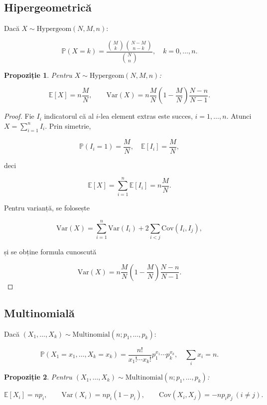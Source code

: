\documentclass[12pt]{article}
\theoremstyle{plain}
\newtheorem{proposition}{Propoziție}
\begin{document}
\subsection{Hipergeometrică}

Dacă $X \sim \mathrm{Hypergeom}(N,M,n)$:


\[
\mathbb{P}(X=k) = \frac{\binom{M}{k}\binom{N-M}{n-k}}{\binom{N}{n}},\quad k=0,\dots,n.
\]



\begin{proposition}
Pentru $X \sim \mathrm{Hypergeom}(N,M,n)$:


\[
\mathbb{E}[X] = n\frac{M}{N},\qquad
\mathrm{Var}(X) = n\frac{M}{N}\left(1-\frac{M}{N}\right)\frac{N-n}{N-1}.
\]


\end{proposition}

\begin{proof}
Fie $I_i$ indicatorul că al $i$-lea element extras este succes, $i=1,\dots,n$.
Atunci $X = \sum_{i=1}^n I_i$.
Prin simetrie,


\[
\mathbb{P}(I_i=1) = \frac{M}{N},\quad \mathbb{E}[I_i]=\frac{M}{N},
\]


deci


\[
\mathbb{E}[X] = \sum_{i=1}^n \mathbb{E}[I_i] = n\frac{M}{N}.
\]


Pentru varianță, se folosește


\[
\mathrm{Var}(X) = \sum_{i=1}^n \mathrm{Var}(I_i) + 2\sum_{i<j}\mathrm{Cov}(I_i,I_j),
\]


și se obține formula cunoscută


\[
\mathrm{Var}(X) = n\frac{M}{N}\left(1-\frac{M}{N}\right)\frac{N-n}{N-1}.
\]


\end{proof}

\subsection{Multinomială}

Dacă $(X_1,\dots,X_k) \sim \mathrm{Multinomial}(n;p_1,\dots,p_k)$:


\[
\mathbb{P}(X_1=x_1,\dots,X_k=x_k)
= \frac{n!}{x_1!\cdots x_k!} p_1^{x_1}\cdots p_k^{x_k},\quad \sum_i x_i = n.
\]



\begin{proposition}
Pentru $(X_1,\dots,X_k) \sim \mathrm{Multinomial}(n;p_1,\dots,p_k)$:


\[
\mathbb{E}[X_i] = np_i,\qquad
\mathrm{Var}(X_i) = np_i(1-p_i),\qquad
\mathrm{Cov}(X_i,X_j) = -np_ip_j\ (i\neq j).
\]


\end{proposition}
\end{document}
